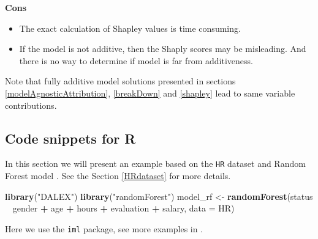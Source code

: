 \documentclass[]{krantz}
\newenvironment{Shaded}{\begin{snugshade}}{\end{snugshade}}
\newcommand{\DataTypeTok}[1]{\textcolor[rgb]{0.13,0.29,0.53}{#1}}
\newcommand{\KeywordTok}[1]{\textcolor[rgb]{0.13,0.29,0.53}{\textbf{#1}}}
\newcommand{\NormalTok}[1]{#1}
\newcommand{\OperatorTok}[1]{\textcolor[rgb]{0.81,0.36,0.00}{\textbf{#1}}}
\newcommand{\StringTok}[1]{\textcolor[rgb]{0.31,0.60,0.02}{#1}}
\providecommand{\tightlist}{%
  \setlength{\itemsep}{0pt}\setlength{\parskip}{0pt}}
\theoremstyle{definition}
\theoremstyle{definition}
\theoremstyle{definition}
\theoremstyle{remark}
\begin{document}
\textbf{Cons}

\begin{itemize}
\tightlist
\item
  The exact calculation of Shapley values is time consuming.
\item
  If the model is not additive, then the Shaply scores may be
  misleading. And there is no way to determine if model is far from
  additiveness.
\end{itemize}

Note that fully additive model solutions presented in sections
\ref{modelAgnosticAttribution}, \ref{breakDown} and \ref{shapley} lead
to same variable contributions.

\hypertarget{code-snippets-for-r-2}{%
\subsection{Code snippets for R}\label{code-snippets-for-r-2}}

In this section we will present an example based on the \texttt{HR}
dataset and Random Forest model \citep{R-randomForest}. See the Section
\ref{HRdataset} for more details.

\begin{Shaded}
\begin{Highlighting}[]
\KeywordTok{library}\NormalTok{(}\StringTok{"DALEX"}\NormalTok{)}
\KeywordTok{library}\NormalTok{(}\StringTok{"randomForest"}\NormalTok{)}
\NormalTok{model_rf <-}\StringTok{ }\KeywordTok{randomForest}\NormalTok{(status }\OperatorTok{~}\StringTok{ }\NormalTok{gender }\OperatorTok{+}\StringTok{ }\NormalTok{age }\OperatorTok{+}\StringTok{ }\NormalTok{hours }\OperatorTok{+}\StringTok{ }\NormalTok{evaluation }\OperatorTok{+}\StringTok{ }\NormalTok{salary, }\DataTypeTok{data =}\NormalTok{ HR)}
\end{Highlighting}
\end{Shaded}

Here we use the \texttt{iml} package, see more examples in
\citep{imlPackage}.

\begin{Shaded}
\end{Shaded}
\end{document}
